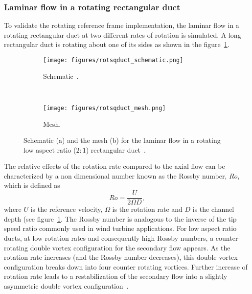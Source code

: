 \subsubsection{Laminar flow in a rotating rectangular duct}
To validate the rotating reference frame implementation, the laminar flow in a rotating rectangular duct at two different rates of rotation is simulated. A long rectangular duct is rotating about one of its sides as shown in the figure~\ref{fig:sqductschem}. 
\begin{figure}[h!]
    \centering
    \captionsetup{justification=centering}
    \begin{subfigure}[b]{0.48\textwidth}
    \captionsetup{justification=centering}
        \texttt{[image: figures/rotsqduct\_schematic.png]}    
    \caption{Schematic~\cite{Speziale1982}.}
    \label{fig:sqductschem}
    \end{subfigure}
    ~ %
    \begin{subfigure}[b]{0.48\textwidth}
    \centering
    \captionsetup{justification=centering}
        \texttt{[image: figures/rotsqduct\_mesh.png]}
        \caption{Mesh.}
    \label{fig:sqductmesh}
    \end{subfigure}
    \caption{Schematic (a) and the mesh (b) for the laminar flow in a rotating low aspect ratio ($2:1$) rectangular duct~\cite{Speziale1982}.}
\end{figure}
The relative effects of the rotation rate compared to the axial flow can be characterized by a non dimensional number known as the Rossby number, $Ro$, which is defined as
\begin{equation}
Ro = \frac{U}{2\Omega D},
\end{equation}
where $U$ is the reference velocity, $\Omega$ is the rotation rate and $D$ is the channel depth (see figure~\ref{fig:sqductschem}. The Rossby number is analogous to the inverse of the tip speed ratio commonly used in wind turbine applications. For low aspect ratio ducts, at low rotation rates and consequently high Rossby numbers, a counter-rotating double vortex configuration for the secondary flow appears. As the rotation rate increases (and the Rossby number decreases), this double vortex configuration breaks down into four counter rotating vortices. Further increase of rotation rate leads to a restabilization of the secondary flow into a slightly asymmetric double vortex configuration~\cite{Speziale1982}.

